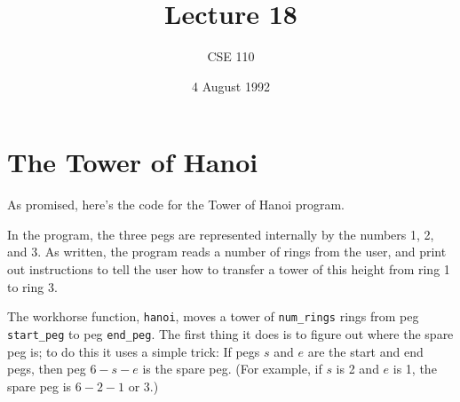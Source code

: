 %
%
%


\def\brac#1{$<${#1}$>$}
\def\Int{{\tt int}}
\def\int{\brac{\Int}}
\def\int{\brac{\Int}}
\def\Shortint{{\tt short~int}}
\def\shortint{\brac{\Shortint}}
\def\Longint{{\tt long~int}}
\def\longint{\brac{\Longint}}
\def\Float{{\tt float}}
\def\float{\brac{\Float}}
\def\Double{{\tt double}}
\def\double{\brac{\Double}}
\def\Char{{\tt char}}
\def\chr{\brac{\Char}}
\def\Void{{\tt void}}
\def\void{\brac{\Void}}

\def\ptr#1{pointer~to {#1}}
\def\p2#1{\brac{\ptr{#1}}}
\def\Ano#1#2{array~of {#1}~{#2}s}
\def\ano#1#2{\brac{\Ano{#1}{#2}}}
\def\Ao#1{array~of {#1}}
\def\ao#1{\brac{\Ao#1}}

\def\np{{\tt NULL} pointer}

\def\breakhere{\mbox{$\otimes$}}


\title{Lecture 18}
\author{CSE 110}
\date{4 August 1992}

\parskip 8pt

\pagestyle{fancy}
\rhead{\thepage}
\cfoot{}




\maketitle

\section{The Tower of Hanoi}

As promised, here's the code for the Tower of Hanoi program.

In the program, the three pegs are represented internally by the
numbers 1, 2, and 3.  As written, the program reads a number of rings
from the user, and print out instructions to tell the user how to
transfer a tower of this height from ring 1 to ring 3.  

The workhorse function, {\tt hanoi}, moves a tower of {\tt num\_rings}
rings from peg {\tt start\_peg} to peg {\tt end\_peg}.  The first thing
it does is to figure out where the spare peg is; to do this it uses a
simple trick: If pegs $s$ and $e$ are the start and end pegs, then peg
$6-s-e$ is the spare peg.  (For example, if $s$ is 2 and $e$ is 1, the
spare peg is $6-2-1$ or $3$.)

